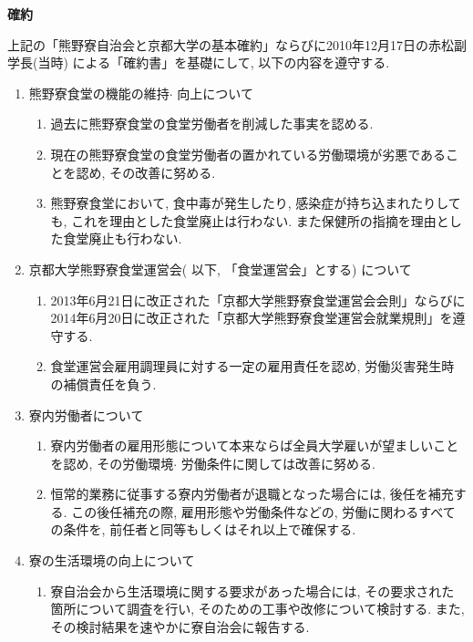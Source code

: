 \documentclass[10pt,b5jsbook,dvips,dvipdfmx,openany]{jsbook}
\theoremstyle{definition}
\begin{document}
		\begin{shadebox}

		\centerline{\bf 確約} 

		上記の「熊野寮自治会と京都大学の基本確約」ならびに2010年12月17日の赤松副学長(当時) による「確約書」を基礎にして, 以下の内容を遵守する. 

		\begin{enumerate}
 		\renewcommand{\labelenumi}{(\Alph{enumi})}
		\item 熊野寮食堂の機能の維持$ \cdot $ 向上について
			\begin{enumerate}
			\renewcommand{\labelenumii}{(\arabic{enumii})}
			\item 過去に熊野寮食堂の食堂労働者を削減した事実を認める. 
			\item 現在の熊野寮食堂の食堂労働者の置かれている労働環境が劣悪であることを認め, その改善に努める. 
			\item 熊野寮食堂において, 食中毒が発生したり, 感染症が持ち込まれたりしても, これを理由とした食堂廃止は行わない. また保健所の指摘を理由とした食堂廃止も行わない. 
			\end{enumerate}
		\item 京都大学熊野寮食堂運営会( 以下, 「食堂運営会」とする) について 
			\begin{enumerate}
			\renewcommand{\labelenumii}{(\arabic{enumii})}
			\item 2013年6月21日に改正された「京都大学熊野寮食堂運営会会則」ならびに2014年6月20日に改正された「京都大学熊野寮食堂運営会就業規則」を遵守する. 
			\item 食堂運営会雇用調理員に対する一定の雇用責任を認め, 労働災害発生時の補償責任を負う. 
			\end{enumerate}
\item 寮内労働者について
			\begin{enumerate}
			\renewcommand{\labelenumii}{(\arabic{enumii})}
			\item 寮内労働者の雇用形態について本来ならば全員大学雇いが望ましいことを認め, その労働環境$ \cdot $ 労働条件に関しては改善に努める. 
			\item 恒常的業務に従事する寮内労働者が退職となった場合には, 後任を補充する. この後任補充の際, 雇用形態や労働条件などの, 労働に関わるすべての条件を, 前任者と同等もしくはそれ以上で確保する. 
			\end{enumerate}
		\item 寮の生活環境の向上について
			\begin{enumerate}
			\renewcommand{\labelenumii}{(\arabic{enumii})}
			\item 寮自治会から生活環境に関する要求があった場合には, その要求された箇所について調査を行い, そのための工事や改修について検討する. また, その検討結果を速やかに寮自治会に報告する. 

\end{enumerate}
\end{enumerate}
\end{shadebox}
\end{document}
